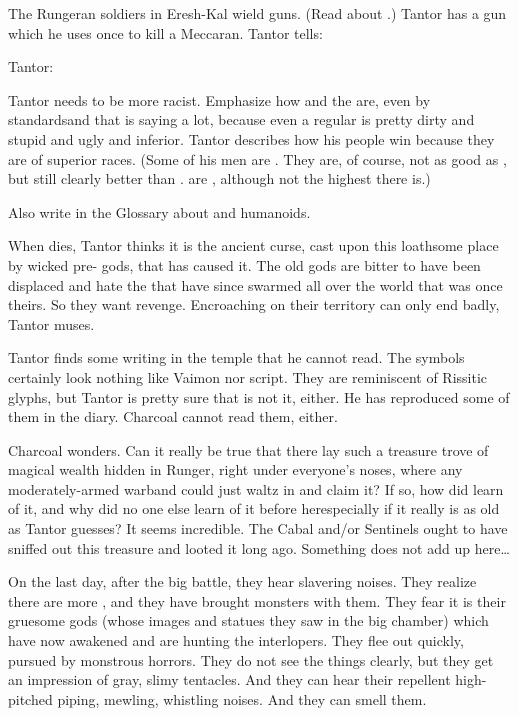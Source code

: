 \begin{changes}
    The Rungeran soldiers in Eresh-Kal wield guns. 
    (Read about .)
    Tantor has a gun which he uses once to kill a Meccaran.
    Tantor tells: 
    \begin{prose}
      Tantor: 
    \end{prose}
    
    Tantor needs to be more racist. 
    Emphasize how  and  the \EreshKali{} are, even by \meccaran{} standards\dash and that is saying a lot, because even a regular \meccaran{} is pretty dirty and stupid and ugly and inferior. 
    Tantor describes how his people win because they are of superior races. 
    (Some of his men are \scathae. 
     They are, of course, not as good as \humans, but still clearly better than \meccara.
     \Scathae{} are , although not the highest there is.)
    
    Also write in the Glossary about  and  humanoids. 
    
    When \Mycah{} dies, Tantor thinks it is the ancient curse, cast upon this loathsome place by wicked pre-\human{} gods, that has caused it. 
    The old gods are bitter to have been displaced and hate the \humans{} that have since swarmed all over the world that was once theirs. 
    So they want revenge. 
    Encroaching on their territory can only end badly, Tantor muses. 
    
    Tantor finds some writing in the temple that he cannot read. 
    The symbols certainly look nothing like Vaimon nor \Ortaican{} script. 
    They are reminiscent of Rissitic glyphs, but Tantor is pretty sure that is not it, either. 
    He has reproduced some of them in the diary. 
    Charcoal cannot read them, either. 
    
    Charcoal wonders. 
    Can it really be true that there lay such a treasure trove of magical wealth hidden in Runger, right under everyone's noses, where any moderately-armed warband could just waltz in and claim it? 
    If so, how did \Takestsha{} learn of it, and why did no one else learn of it before her\dash especially if it really is as old as Tantor guesses? 
    It seems incredible. 
    The Cabal and/or Sentinels ought to have sniffed out this treasure and looted it long ago. 
    Something does not add up here\ldots{} 

    On the last day, after the big battle, they hear slavering noises.
    They realize there are more \meccara, and they have brought monsters with them. 
    They fear it is their gruesome gods (whose images and statues they saw in the big chamber) which have now awakened and are hunting the interlopers. 
    They flee out quickly, pursued by monstrous horrors. 
    They do not see the things clearly, but they get an impression of gray, slimy tentacles. 
    And they can hear their repellent high-pitched piping, mewling, whistling noises.
    And they can smell them.
    

\end{changes}
